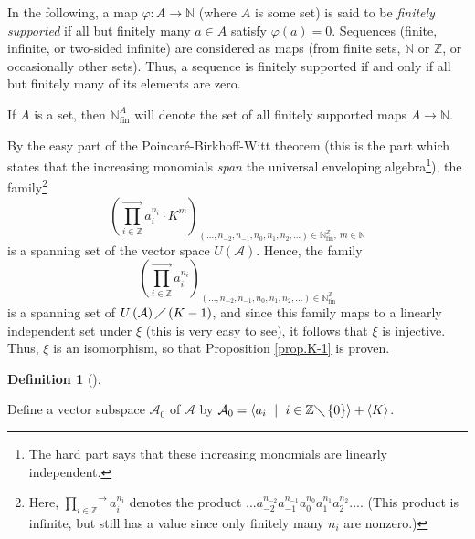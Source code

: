 \documentclass
[numbers=enddot,12pt,final,onecolumn,german,notitlepage]{scrartcl}%
\theoremstyle{definition}
\newtheorem{defi}[theo]{Definition}
\newenvironment{definition}[1][]
{\begin{defi}[#1]\begin{leftbar}}
{\end{leftbar}\end{defi}}
\begin{document}
In the following, a map $\varphi:A\rightarrow\mathbb{N}$ (where $A$ is some
set) is said to be \textit{finitely supported} if all but finitely many $a\in
A$ satisfy $\varphi\left(  a\right)  =0$. Sequences (finite, infinite, or
two-sided infinite) are considered as maps (from finite sets, $\mathbb{N}$ or
$\mathbb{Z}$, or occasionally other sets). Thus, a sequence is finitely
supported if and only if all but finitely many of its elements are zero.

If $A$ is a set, then $\mathbb{N}_{\operatorname*{fin}}^{A}$ will denote the
set of all finitely supported maps $A\rightarrow\mathbb{N}$.

By the easy part of the Poincar\'{e}-Birkhoff-Witt theorem (this is the part
which states that the increasing monomials \textit{span} the universal
enveloping algebra\footnote{The hard part says that these increasing monomials
are linearly independent.}), the family\footnote{Here, $\overset{\rightarrow
}{\prod\limits_{i\in\mathbb{Z}}}a_{i}^{n_{i}}$ denotes the product
$...a_{-2}^{n_{-2}}a_{-1}^{n_{-1}}a_{0}^{n_{0}}a_{1}^{n_{1}}a_{2}^{n_{2}}...$.
(This product is infinite, but still has a value since only finitely many
$n_{i}$ are nonzero.)}%
\[
\left(  \overset{\rightarrow}{\prod\limits_{i\in\mathbb{Z}}}a_{i}^{n_{i}}\cdot
K^{m}\right)  _{\left(  ...,n_{-2},n_{-1},n_{0},n_{1},n_{2},...\right)
\in\mathbb{N}_{\operatorname*{fin}}^{\mathbb{Z}},\ m\in\mathbb{N}}%
\]
is a spanning set of the vector space $U\left(  \mathcal{A}\right)  $. Hence,
the family
\[
\left(  \overset{\rightarrow}{\prod\limits_{i\in\mathbb{Z}}}a_{i}^{n_{i}%
}\right)  _{\left(  ...,n_{-2},n_{-1},n_{0},n_{1},n_{2},...\right)
\in\mathbb{N}_{\operatorname*{fin}}^{\mathbb{Z}}}%
\]
is a spanning set of $U\left(  \mathcal{A}\right)  \diagup\left(  K-1\right)
$, and since this family maps to a linearly independent set under $\xi$ (this
is very easy to see), it follows that $\xi$ is injective. Thus, $\xi$ is an
isomorphism, so that Proposition \ref{prop.K-1} is proven.

\begin{definition}
\label{def.A0}Define a vector subspace $\mathcal{A}_{0}$ of $\mathcal{A}$ by
$\mathcal{A}_{0}=\left\langle a_{i}\ \mid\ i\in\mathbb{Z}\diagdown\left\{
0\right\}  \right\rangle +\left\langle K\right\rangle $.
\end{definition}
\end{document}
